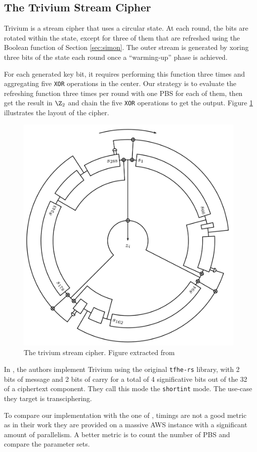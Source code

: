 \subsection{The Trivium Stream Cipher}
\label{sec:trivium}

Trivium \cite{DBLP:conf/isw/Canniere06} is a stream cipher that uses a circular state. At each round, the bits are rotated within the state, except for three of them that are refreshed using the Boolean function of Section \ref{sec:simon}. The outer stream is generated by xoring three bits of the state each round once a ``warming-up'' phase is achieved. 


For each generated key bit, it requires performing this function three times and aggregating five \texttt{XOR} operations in the center. Our strategy is to evaluate the refreshing function three times per round with one PBS for each of them, then get the result in $\Z_2$ and chain the five \texttt{XOR} operations to get the output.
Figure \ref{fig:triviuml} illustrates the layout of the cipher.
\begin{figure}
    \centering
    \includegraphics[width=0.5\linewidth]{images/trivium.png}
    \caption{The trivium stream cipher. Figure extracted from \cite{DBLP:conf/isw/Canniere06}}
    \label{fig:triviuml}
\end{figure}


In \cite{DBLP:conf/wahc/BalenboisOS23}, the authors implement Trivium using the original \texttt{tfhe-rs} library, with 2 bits of message and 2 bits of carry for a total of 4 significative bits out of the 32 of a ciphertext component. They call this mode the \texttt{shortint} mode. The use-case they target is transciphering.

To compare our implementation with the one of \cite{DBLP:conf/wahc/BalenboisOS23}, timings are not a good metric as in their work they are provided on a massive AWS instance with a significant amount of parallelism. A better metric is to count the number of PBS and compare the parameter sets.

